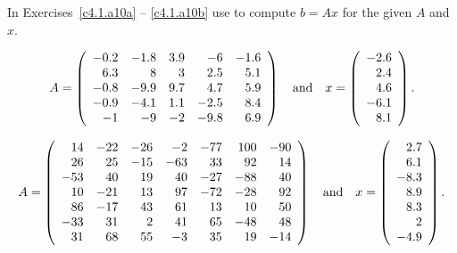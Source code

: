 \documentclass{ximera}
\begin{document}
\noindent In Exercises~\ref{c4.1.a10a} -- \ref{c4.1.a10b} use \Matlab to
compute $b=Ax$ for the given $A$ and $x$.
\begin{exercise} \label{c4.1.a10a}
\begin{equation*}
A=\left(
\begin{array}{rrrrr}
   -0.2 &   -1.8 &    3.9 &    -6 &   -1.6\\
    6.3 &    8   &    3   &    2.5 &    5.1\\
   -0.8 &   -9.9 &    9.7 &    4.7 &    5.9\\
   -0.9 &   -4.1 &    1.1 &   -2.5 &    8.4\\
   -1 &   -9 &   -2 &  -9.8 &    6.9
\end{array}\right)
\quad\mbox{and}\quad
x = \left( \begin{array}{r} -2.6\\  2.4\\  4.6\\   -6.1\\    8.1
\end{array}\right).
\end{equation*}
\end{exercise}
\begin{exercise} \label{c4.1.a10b}
\begin{equation*}
A=\left(
\begin{array}{rrrrrrr}
    14 & -22  &-26 &  -2 & -77 & 100 & -90\\
    26 &  25  &-15 & -63 &  33 &  92 &  14\\
   -53 &  40  & 19 &  40 & -27 & -88 &  40\\
    10 & -21  & 13 &  97 & -72 & -28 &  92\\
    86 & -17  & 43 &  61 &  13 &  10 &  50\\
   -33 &  31  &  2 &  41 &  65 & -48 &  48\\
    31 &  68  & 55 &  -3 &  35 &  19 & -14
\end{array}
\right)\quad\mbox{and}\quad
x = \left( \begin{array}{r} 2.7\\   6.1\\   -8.3\\    8.9\\    8.3\\    2\\
  -4.9
\end{array}\right).
\end{equation*}
\end{exercise}
\end{document}
